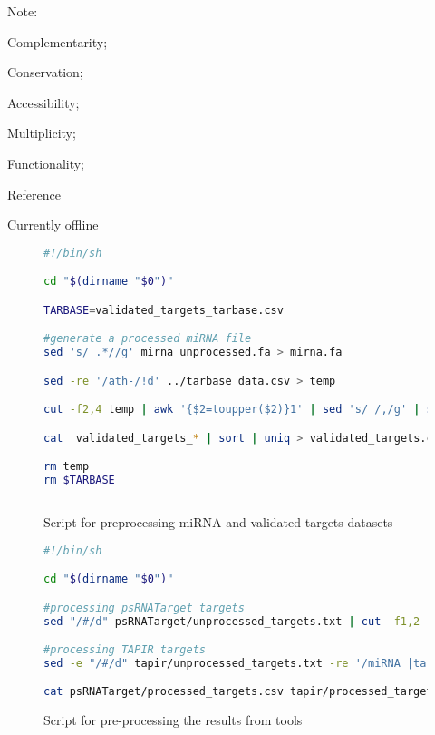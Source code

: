 \begin{landscape}
\begin{table}[htb]
\begin{threeparttable}
\begin{tabular} {c c c c c c c l c}
      \end{tabular}
      \begin{tablenotes}
        {\scriptsize  Note: \item[1] Complementarity; \item[2] Conservation; \item[3] Accessibility; \item[4] Multiplicity; \item[5] Functionality; \item[6] Reference \item[7] Currently offline}
      \end{tablenotes}
     \end{threeparttable}
    \end{table}
\end{landscape}

\begin{figure}[H]
\begin{lstlisting}[language=bash]
#!/bin/sh

cd "$(dirname "$0")"

TARBASE=validated_targets_tarbase.csv

#generate a processed miRNA file
sed 's/ .*//g' mirna_unprocessed.fa > mirna.fa

sed -re '/ath-/!d' ../tarbase_data.csv > temp 

cut -f2,4 temp | awk '{$2=toupper($2)}1' | sed 's/ /,/g' | sed 's/mir/miR/g'| awk -F, '{print $2,$1}' OFS=, > $TARBASE

cat  validated_targets_* | sort | uniq > validated_targets.csv

rm temp
rm $TARBASE
	
\end{lstlisting}
\caption{Script for preprocessing miRNA and validated targets datasets}
\label{scr:datasets}
\end{figure}

\begin{figure}[H]
\begin{lstlisting}[language=bash]
#!/bin/sh

cd "$(dirname "$0")"

#processing psRNATarget targets
sed "/#/d" psRNATarget/unprocessed_targets.txt | cut -f1,2  | tail -n +2 | sed 's/\t/,/g' | awk -F, '{print $2,$1}' OFS=, | sort | uniq > psRNATarget/processed_targets.csv

#processing TAPIR targets 
sed -e "/#/d" tapir/unprocessed_targets.txt -re '/miRNA |target /!d' -e 's/([[:space:]])+/\t/g' | cut -f2 | paste - - -d"," |  tr ' ' ',' | awk -F, '{print $2,$1}' OFS=, | sort | uniq > tapir/processed_targets.csv

cat psRNATarget/processed_targets.csv tapir/processed_targets.csv validated_targets.csv | sort | uniq  > subset.csv
\end{lstlisting}
\caption{Script for pre-processing the results from tools}
\label{scr:tools}
\end{figure}
